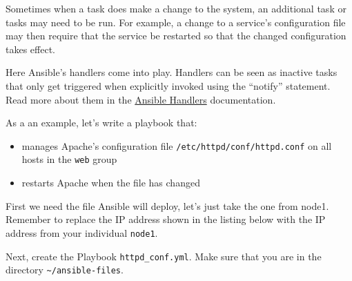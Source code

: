 Sometimes when a task does make a change to the system, an additional
task or tasks may need to be run. For example, a change to a service's
configuration file may then require that the service be restarted so
that the changed configuration takes effect.

Here Ansible's handlers come into play. Handlers can be seen as inactive
tasks that only get triggered when explicitly invoked using the
``notify'' statement. Read more about them in the
\href{http://docs.ansible.com/ansible/latest/playbooks_intro.html\#handlers-running-operations-on-change}{Ansible
Handlers} documentation.

As a an example, let's write a playbook that:

\begin{itemize}
\tightlist
\item
  manages Apache's configuration file
  \texttt{/etc/httpd/conf/httpd.conf} on all hosts in the \texttt{web}
  group
\item
  restarts Apache when the file has changed
\end{itemize}

First we need the file Ansible will deploy, let's just take the one from
node1. Remember to replace the IP address shown in the listing below
with the IP address from your individual \texttt{node1}.

\begin{Shaded}
\begin{Highlighting}[]
\ExtensionTok{[student@controller}\NormalTok{ ansible{-}files]$ scp 10.3.48.[100+PARTICIPANT\_ID]:/etc/httpd/conf/httpd.conf \\}
\end{Highlighting}
\end{Shaded}

Next, create the Playbook \texttt{httpd\_conf.yml}. Make sure that you
are in the directory \texttt{\textasciitilde{}/ansible-files}.

